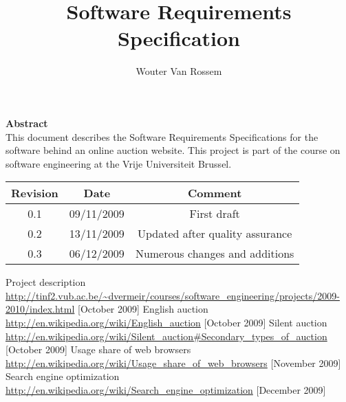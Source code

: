 \documentclass{report}
\begin{document}
\title{Software Requirements Specification}
\author{Wouter Van Rossem}

\maketitle
\begin{center}
	\textbf{Abstract} \\
	This document describes the Software Requirements Specifications for
	the software behind an online auction website. This project is part of 
	the course on software engineering at the Vrije Universiteit Brussel.
	\bigskip
\begin{tabular}{|c|c|c|}
	\hline  \textbf{Revision} & \textbf{Date} & \textbf{Comment} \\ 
	\hline 0.1 & 09/11/2009 & First draft \\ 
	\hline 0.2 & 13/11/2009 & Updated after quality assurance \\ 
	\hline 0.3 & 06/12/2009 & Numerous changes and additions \\ 
	\hline 
\end{tabular} 
\end{center}
\tableofcontents








\begin{thebibliography}{9}
 Project description \\		
	\url{http://tinf2.vub.ac.be/~dvermeir/courses/software_engineering/projects/2009-2010/index.html} [October 2009]
 English auction \\ 
	\url{http://en.wikipedia.org/wiki/English_auction} [October 2009]
 Silent auction \\
	\url{http://en.wikipedia.org/wiki/Silent_auction#Secondary_types_of_auction} [October 2009]
 Usage share of web browsers \\
	\url{http://en.wikipedia.org/wiki/Usage_share_of_web_browsers} [November 2009]
 Search engine optimization \\
	\url{http://en.wikipedia.org/wiki/Search_engine_optimization} [December 2009]
\end{thebibliography}

\end{document}
